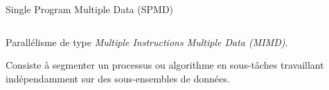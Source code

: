 \documentclass[../main.tex]{subfiles}
\begin{document}
\begin{frame}{Single Program Multiple Data (SPMD)}
  \begin{columns}
    \begin{column}{.6\linewidth}
      \begin{ctrlitemize}{.5 em}
        \item Parallélisme de type \emph{Multiple Instructions Multiple Data (MIMD)}.
        \item Consiste à segmenter un processus ou algorithme en sous-tâches travaillant indépendamment sur des sous-ensembles de données.
      \end{ctrlitemize}


\end{column}
\end{columns}
\end{frame}
\end{document}
